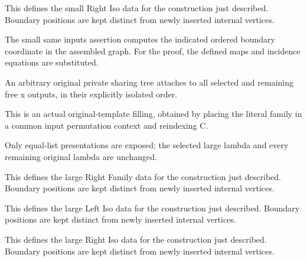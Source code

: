 This defines the small Right Iso data for the construction just described. Boundary positions are kept distinct from newly inserted internal vertices.
\par{}

The small same inputs assertion computes the indicated ordered boundary coordinate in the assembled graph.
For the proof, the defined maps and incidence equations are substituted.
\par{}

An arbitrary original private sharing tree attaches to all selected and remaining free x outputs, in their explicitly isolated order.
\par{}

This is an actual original-template filling, obtained by placing the literal family in a common input permutation context and reindexing C.
\par{}

Only equal-list presentations are exposed; the selected large lambda and every remaining original lambda are unchanged.
\par{}

This defines the large Right Family data for the construction just described. Boundary positions are kept distinct from newly inserted internal vertices.
\par{}

This defines the large Left Iso data for the construction just described. Boundary positions are kept distinct from newly inserted internal vertices.
\par{}

This defines the large Right Iso data for the construction just described. Boundary positions are kept distinct from newly inserted internal vertices.
\par{}

